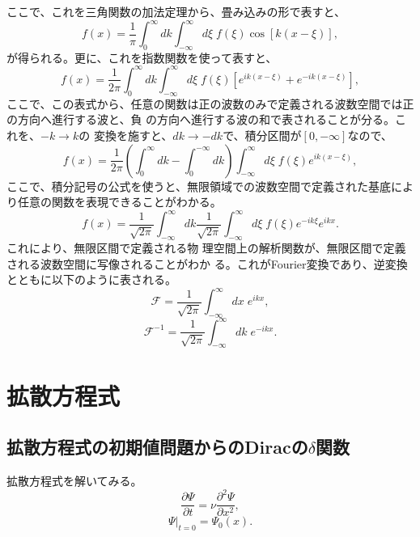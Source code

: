 ここで、これを三角関数の加法定理から、畳み込みの形で表すと、
\begin{equation}
 f(x) = \frac{1}{\pi}\int_{0}^{\infty}dk\int_{-\infty}^{\infty}d\xi \mspace{5mu} f(\xi) 
  \cos \left[k(x - \xi)\right],
\end{equation}
が得られる。更に、これを指数関数を使って表すと、
\begin{equation}
  f(x) = \frac{1}{2\pi}\int_{0}^{\infty}dk\int_{-\infty}^{\infty}d\xi \mspace{5mu} f(\xi) 
  \left[e^{ik(x-\xi)}+e^{-ik(x-\xi)}\right],
\end{equation}
ここで、この表式から、任意の関数は正の波数のみで定義される波数空間では正の方向へ進行する波と、負
の方向へ進行する波の和で表されることが分る。これを、$-k\rightarrow k$の
変換を施すと、$dk\rightarrow -dk$で、積分区間が$[0,-\infty]$なので、
\begin{equation}
  f(x) = \frac{1}{2\pi}
   \left(\int_{0}^{\infty}dk-\int_{0}^{-\infty}dk\right)
   \int_{-\infty}^{\infty}d\xi \mspace{5mu} f(\xi) e^{ik(x-\xi)},
\end{equation}
ここで、積分記号の公式を使うと、無限領域での波数空間で定義された基底によ
り任意の関数を表現できることがわかる。
\begin{equation}
  f(x) = \frac{1}{\sqrt{2\pi}}\int_{-\infty}^{\infty}dk\frac{1}{\sqrt{2\pi}}
   \int_{-\infty}^{\infty}d\xi \mspace{5mu} f(\xi) e^{-ik\xi}e^{ikx}.
\end{equation}
これにより、無限区間で定義される物
理空間上の解析関数が、無限区間で定義される波数空間に写像されることがわか
る。これがFourier変換であり、逆変換とともに以下のように表される。
\begin{equation}
 \mathcal{F} = \frac{1}{\sqrt{2\pi}}\int_{-\infty}^{\infty}dx\mspace{5mu} e^{ikx},
\end{equation}
\begin{equation}
 \mathcal{F}^{-1} = \frac{1}{\sqrt{2\pi}}\int_{-\infty}^{\infty}dk\mspace{5mu} e^{-ikx}.
\end{equation}

\section{拡散方程式}
\subsection{拡散方程式の初期値問題からのDiracの$\delta$関数}
拡散方程式を解いてみる。
\begin{equation}
 \frac{\partial\Psi}{\partial t} 
  = \nu\frac{\partial^2\Psi}{\partial x^2},
\end{equation}
\begin{equation}
 \Psi|_{t=0} = \Psi_0(x).
\end{equation}

